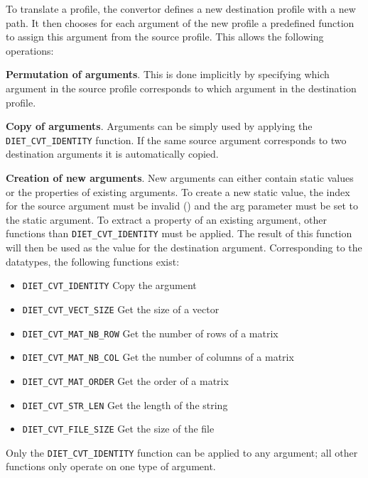 To translate a profile, the convertor defines a new destination profile with a
new path. It then chooses for each argument of the new profile a predefined
function to assign this argument from the source profile. This allows the
following operations:

\begin{description}
\item{\textbf{Permutation of arguments}}. This is done implicitly by specifying
  which argument in the source profile corresponds to which argument in the
  destination profile.
\item{\textbf{Copy of arguments}}. Arguments can be simply used by applying the
  \texttt{DIET\_CVT\_IDENTITY} function. If the same source argument
  corresponds to two destination arguments it is automatically copied.
\item{\textbf{Creation of new arguments}}. New arguments can either contain
  static values or the properties of existing arguments. To create a new static
  value, the index for the source argument must be invalid () and the arg
  parameter must be set to the static argument. To extract a property of an
  existing argument, other functions than \texttt{DIET\_CVT\_IDENTITY} must be
  applied. The result of this function will then be used as the value for the
  destination argument.  Corresponding to the \diet datatypes, the following
  functions exist: \\
\begin{itemize}
\item{\texttt{DIET\_CVT\_IDENTITY}} Copy the argument
\item{\texttt{DIET\_CVT\_VECT\_SIZE}} Get the size of a vector
\item{\texttt{DIET\_CVT\_MAT\_NB\_ROW}} Get the number of rows of a matrix
\item{\texttt{DIET\_CVT\_MAT\_NB\_COL}} Get the number of columns of a matrix
\item{\texttt{DIET\_CVT\_MAT\_ORDER}} Get the order of a matrix
\item{\texttt{DIET\_CVT\_STR\_LEN}} Get the length of the string
\item{\texttt{DIET\_CVT\_FILE\_SIZE}} Get the size of the file
\end{itemize}
Only the \texttt{DIET\_CVT\_IDENTITY} function can be applied to any argument;
all other functions only operate on one type of argument.

\end{description}

